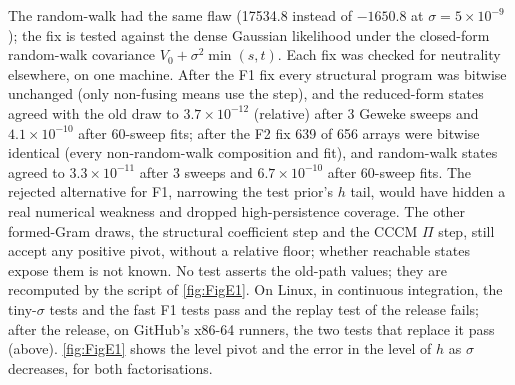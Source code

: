 The random-walk  had the same flaw (17534.8 instead of $-1650.8$ at
$\sigma = 5\times10^{-9}$); the fix is tested against the dense Gaussian likelihood under the
closed-form random-walk covariance $V_0 + \sigma^2\min(s, t)$.
Each fix was checked for neutrality elsewhere, on one machine.
After the F1 fix every structural program was bitwise unchanged (only non-fusing means use the
step), and the reduced-form states agreed with the old draw to $3.7\times10^{-12}$ (relative) after
3 Geweke sweeps and $4.1\times10^{-10}$ after 60-sweep fits; after the F2 fix 639 of 656 arrays were
bitwise identical (every non-random-walk composition and fit), and random-walk states agreed to
$3.3\times10^{-11}$ after 3 sweeps and $6.7\times10^{-10}$ after 60-sweep fits.
The rejected alternative for F1, narrowing the test prior's $h$ tail, would have hidden a real
numerical weakness and dropped high-persistence coverage.
The other formed-Gram draws, the structural coefficient step and the CCCM $\Pi$ step, still accept
any positive pivot, without a relative floor; whether reachable states expose them is not known.
No test asserts the old-path values; they are recomputed by the script of \cref{fig:FigE1}.
On Linux, in continuous integration, the tiny-$\sigma$ tests and the fast F1 tests pass and the replay
test of the release fails; after the release, on GitHub's x86-64 runners, the two tests that replace
it pass (above).
\cref{fig:FigE1} shows the level pivot and the error in the level of $h$ as $\sigma$
decreases, for both factorisations.

